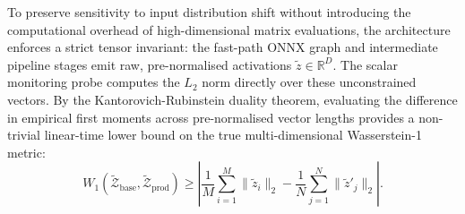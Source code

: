 To preserve sensitivity to input distribution shift without introducing the computational overhead of high-dimensional matrix evaluations, the architecture enforces a strict tensor invariant: the fast-path ONNX graph and intermediate pipeline stages emit raw, pre-normalised activations $\tilde{z} \in \mathbb{R}^D$. The scalar monitoring probe computes the $L_2$ norm directly over these unconstrained vectors. By the Kantorovich-Rubinstein duality theorem, evaluating the difference in empirical first moments across pre-normalised vector lengths provides a non-trivial linear-time lower bound on the true multi-dimensional Wasserstein-1 metric:
\begin{equation}
    W_1(\tilde{\mathcal{Z}}_{\text{base}}, \tilde{\mathcal{Z}}_{\text{prod}}) \ge \left| \frac{1}{M}\sum_{i=1}^M \|\tilde{z}_i\|_2 - \frac{1}{N}\sum_{j=1}^N \|\tilde{z}'_j\|_2 \right|.
    \label{eq:w1_lower_bound}
\end{equation}
